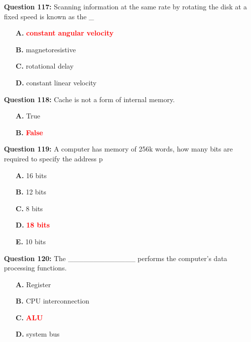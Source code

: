 \documentclass[12pt,a4paper]{article}
\begin{document}
\vspace{0.5cm}

\textbf{Question 117:} Scanning information at the same rate by rotating the disk at a fixed speed is known as the _

\begin{itemize}
    \item[\textbf{A.}] \textcolor{red}{\textbf{constant angular velocity}}
    \item[\textbf{B.}] magnetoresistive
    \item[\textbf{C.}] rotational delay
    \item[\textbf{D.}] constant linear velocity
\end{itemize}

\vspace{0.5cm}

\textbf{Question 118:} Cache is not a form of internal memory.

\begin{itemize}
    \item[\textbf{A.}] True
    \item[\textbf{B.}] \textcolor{red}{\textbf{False}}
\end{itemize}

\vspace{0.5cm}

\textbf{Question 119:} A computer has memory of 256k words, how many bits are required to specify the address p

\begin{itemize}
    \item[\textbf{A.}] 16 bits
    \item[\textbf{B.}] 12 bits
    \item[\textbf{C.}] 8 bits
    \item[\textbf{D.}] \textcolor{red}{\textbf{18 bits}}
    \item[\textbf{E.}] 10 bits
\end{itemize}

\vspace{0.5cm}

\textbf{Question 120:} The _____________ performs the computer's data processing functions.

\begin{itemize}
    \item[\textbf{A.}] Register
    \item[\textbf{B.}] CPU interconnection
    \item[\textbf{C.}] \textcolor{red}{\textbf{ALU}}
    \item[\textbf{D.}] system bus
\end{itemize}
\end{document}

